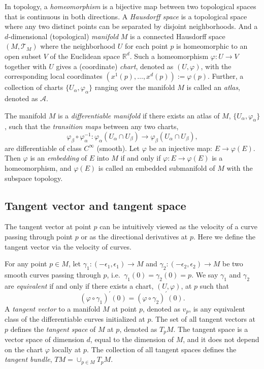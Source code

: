 \documentclass[11pt,a4paper,]{article}
\begin{document}
In topology, a \emph{homeomorphism} is a bijective map between two topological spaces that is continuous in both directions. A \emph{Hausdorff space} is a topological space where any two distinct points can be separated by disjoint neighborhoods. And a \(d\)-dimensional (topological) \emph{manifold} \(M\) is a connected Hausdorff space \((M, \mathcal{T}_M)\) where the neighborhood \(U\) for each point \(p\) is homeomorphic to an open subset \(V\) of the Euclidean space \(\mathbb{R}^d\). Such a homeomorphism \(\varphi: U \rightarrow V\) together with \(U\) gives a (coordinate) \emph{chart}, denoted as \((U, \varphi)\), with the corresponding local coordinates \((x^1(p),\dots, x^d(p)) := \varphi(p)\). Further, a collection of charts \(\{U_\alpha, \varphi_\alpha\}\) ranging over the manifold \(M\) is called an \emph{atlas}, denoted as \(\mathcal{A}\).

The manifold \(M\) is a \emph{differentiable manifold} if there exists an atlas of \(M\), \(\{U_\alpha, \varphi_\alpha\}\), such that the \emph{transition maps} between any two charts,
\[
\varphi_\beta \circ \varphi_\alpha^{-1}: \varphi_\alpha(U_\alpha \cap U_\beta) \rightarrow \varphi_\beta(U_\alpha \cap U_\beta),
\] are differentiable of class \(C^\infty\) (smooth).
Let \(\varphi\) be an injective map: \(E \rightarrow \varphi(E)\). Then \(\varphi\) is an \emph{embedding} of \(E\) into \(M\) if and only if
\(\varphi: E \rightarrow \varphi(E)\) is a homeomorphism, and \(\varphi(E)\) is called an embedded submanifold of \(M\) with the subspace topology.

\hypertarget{tangent-vector-and-tangent-space}{%
\subsection{Tangent vector and tangent space}\label{tangent-vector-and-tangent-space}}

The tangent vector at point \(p\) can be intuitively viewed as the velocity of a curve passing through point \(p\) or as the directional derivatives at \(p\). Here we define the tangent vector via the velocity of curves.

For any point \(p \in M\), let \(\gamma_1: (-\epsilon_1, \epsilon_1)\rightarrow M\) and \(\gamma_2: (-\epsilon_2, \epsilon_2)\rightarrow M\) be two smooth curves passing through \(p\), i.e.~\(\gamma_1(0) = \gamma_2(0) = p\). We say \(\gamma_1\) and \(\gamma_2\) are \emph{equivalent} if and only if there exists a chart, \((U,\varphi)\), at \(p\) such that
\[
(\varphi \circ \gamma_1)^\prime(0) = (\varphi \circ \gamma_2)^\prime(0).
\]
A \emph{tangent vector} to a manifold \(M\) at point \(p\), denoted as \(v_p\), is any equivalent class of the differentiable curves initialized at \(p\). The set of all tangent vectors at \(p\) defines the \emph{tangent space} of \(M\) at \(p\), denoted as \(T_pM\). The tangent space is a vector space of dimension \(d\), equal to the dimension of \(M\), and it does not depend on the chart \(\varphi\) locally at \(p\). The collection of all tangent spaces defines the \emph{tangent bundle}, \(TM = \cup_{p \in M}T_pM\).
\end{document}
